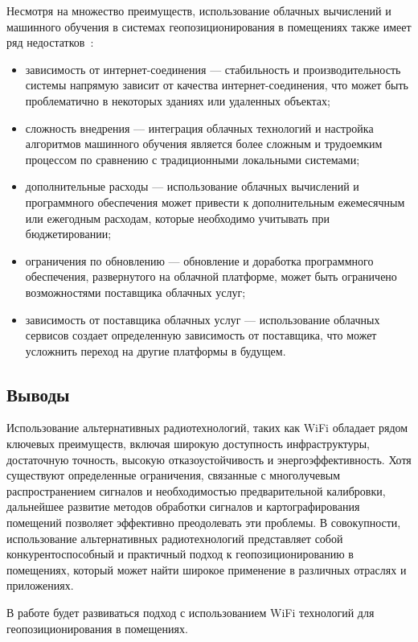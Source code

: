 Несмотря на множество преимуществ, использование облачных вычислений и машинного обучения в системах геопозиционирования в помещениях также имеет ряд недостатков~\cite{cloudML}:

\begin{itemize}[label=---]
    \item зависимость от интернет-соединения --- стабильность и производительность системы напрямую зависит от качества интернет-соединения, что может быть проблематично в некоторых зданиях или удаленных объектах;
    \item сложность внедрения --- интеграция облачных технологий и настройка алгоритмов машинного обучения является более сложным и трудоемким процессом по сравнению с традиционными локальными системами;
    \item дополнительные расходы --- использование облачных вычислений и программного обеспечения может привести к дополнительным ежемесячным или ежегодным расходам, которые необходимо учитывать при бюджетировании;
    \item ограничения по обновлению --- обновление и доработка программного обеспечения, развернутого на облачной платформе, может быть ограничено возможностями поставщика облачных услуг;
    \item зависимость от поставщика облачных услуг --- использование облачных сервисов создает определенную зависимость от поставщика, что может усложнить переход на другие платформы в будущем.
\end{itemize}

\subsection{Выводы}

Использование альтернативных радиотехнологий, таких как WiFi обладает рядом ключевых преимуществ, включая широкую доступность инфраструктуры, достаточную точность, высокую отказоустойчивость и энергоэффективность. Хотя существуют определенные ограничения, связанные с многолучевым распространением сигналов и необходимостью предварительной калибровки, дальнейшее развитие методов обработки сигналов и картографирования помещений позволяет эффективно преодолевать эти проблемы. В совокупности, использование альтернативных радиотехнологий представляет собой конкурентоспособный и практичный подход к геопозиционированию в помещениях, который может найти широкое применение в различных отраслях и приложениях.

В работе будет развиваться подход с использованием WiFi технологий для геопозиционирования в помещениях.


